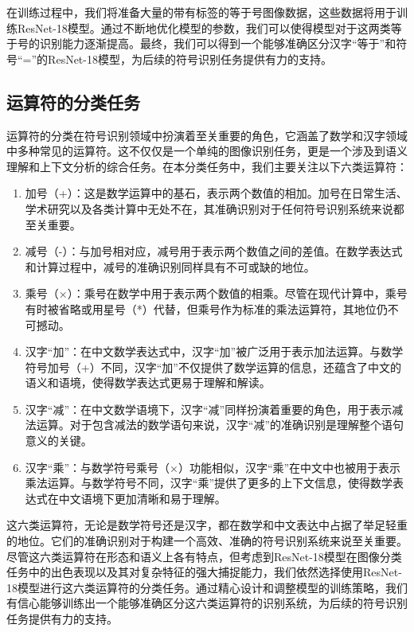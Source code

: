 在训练过程中，我们将准备大量的带有标签的等于号图像数据，这些数据将用于训练ResNet-18模型。通过不断地优化模型的参数，我们可以使得模型对于这两类等于号的识别能力逐渐提高。最终，我们可以得到一个能够准确区分汉字“等于”和符号“=”的ResNet-18模型，为后续的符号识别任务提供有力的支持。

\subsection{运算符的分类任务}

运算符的分类在符号识别领域中扮演着至关重要的角色，它涵盖了数学和汉字领域中多种常见的运算符。这不仅仅是一个单纯的图像识别任务，更是一个涉及到语义理解和上下文分析的综合任务。在本分类任务中，我们主要关注以下六类运算符：

\begin{enumerate}
	\item 加号（+）：这是数学运算中的基石，表示两个数值的相加。加号在日常生活、学术研究以及各类计算中无处不在，其准确识别对于任何符号识别系统来说都至关重要。
	\item 减号（-）：与加号相对应，减号用于表示两个数值之间的差值。在数学表达式和计算过程中，减号的准确识别同样具有不可或缺的地位。
	\item 乘号（×）：乘号在数学中用于表示两个数值的相乘。尽管在现代计算中，乘号有时被省略或用星号（*）代替，但乘号作为标准的乘法运算符，其地位仍不可撼动。
	\item 汉字“加”：在中文数学表达式中，汉字“加”被广泛用于表示加法运算。与数学符号加号（+）不同，汉字“加”不仅提供了数学运算的信息，还蕴含了中文的语义和语境，使得数学表达式更易于理解和解读。
	\item 汉字“减”：在中文数学语境下，汉字“减”同样扮演着重要的角色，用于表示减法运算。对于包含减法的数学语句来说，汉字“减”的准确识别是理解整个语句意义的关键。
	\item 汉字“乘”：与数学符号乘号（×）功能相似，汉字“乘”在中文中也被用于表示乘法运算。与数学符号不同，汉字“乘”提供了更多的上下文信息，使得数学表达式在中文语境下更加清晰和易于理解。
\end{enumerate}

这六类运算符，无论是数学符号还是汉字，都在数学和中文表达中占据了举足轻重的地位。它们的准确识别对于构建一个高效、准确的符号识别系统来说至关重要。尽管这六类运算符在形态和语义上各有特点，但考虑到ResNet-18模型在图像分类任务中的出色表现以及其对复杂特征的强大捕捉能力，我们依然选择使用ResNet-18模型进行这六类运算符的分类任务。通过精心设计和调整模型的训练策略，我们有信心能够训练出一个能够准确区分这六类运算符的识别系统，为后续的符号识别任务提供有力的支持。


